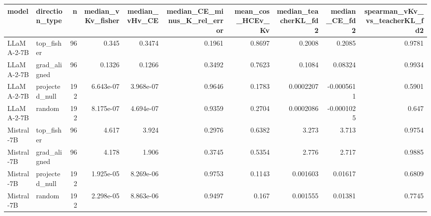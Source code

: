 \begin{tabular}{llrrrrrrrr}
\toprule
model & direction_type & n & median_vKv_fisher & median_vHv_CE & median_CE_minus_K_rel_error & mean_cos_HCEv_Kv & median_teacherKL_fd2 & median_CE_fd2 & spearman_vKv_vs_teacherKL_fd2 \\
\midrule
LLaMA-2-7B & top_fisher & 96 & 0.345 & 0.3474 & 0.1961 & 0.8697 & 0.2008 & 0.2085 & 0.9781 \\
LLaMA-2-7B & grad_aligned & 96 & 0.1326 & 0.1266 & 0.3492 & 0.7623 & 0.1084 & 0.08324 & 0.9934 \\
LLaMA-2-7B & projected_null & 192 & 6.643e-07 & 3.968e-07 & 0.9646 & 0.1783 & 0.0002207 & -0.0005611 & 0.5901 \\
LLaMA-2-7B & random & 192 & 8.175e-07 & 4.694e-07 & 0.9359 & 0.2704 & 0.0002086 & -0.0001025 & 0.647 \\
Mistral-7B & top_fisher & 96 & 4.617 & 3.924 & 0.2976 & 0.6382 & 3.273 & 3.713 & 0.9754 \\
Mistral-7B & grad_aligned & 96 & 4.178 & 1.906 & 0.3745 & 0.5354 & 2.776 & 2.717 & 0.9885 \\
Mistral-7B & projected_null & 192 & 1.925e-05 & 8.269e-06 & 0.9753 & 0.1143 & 0.001603 & 0.01617 & 0.6809 \\
Mistral-7B & random & 192 & 2.298e-05 & 8.863e-06 & 0.9497 & 0.167 & 0.001555 & 0.01381 & 0.7745 \\
\bottomrule
\end{tabular}
